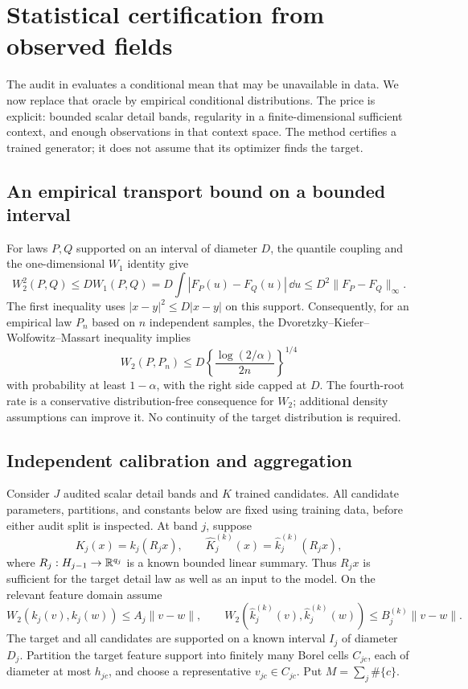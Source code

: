 \section{Statistical certification from observed fields}\label{sec:observed-audit}
The audit in  evaluates a conditional mean that may be unavailable in data. We now replace that oracle by empirical conditional distributions. The price is explicit: bounded scalar detail bands, regularity in a finite-dimensional sufficient context, and enough observations in that context space. The method certifies a trained generator; it does not assume that its optimizer finds the target.

\subsection{An empirical transport bound on a bounded interval}
For laws $P,Q$ supported on an interval of diameter $D$, the quantile coupling and the one-dimensional $W_1$ identity give
\begin{equation}\label{eq:cdf-transport}
 W_2^2(P,Q)\le D W_1(P,Q)
 =D\int|F_P(u)-F_Q(u)|\,\dd u
 \le D^2\|F_P-F_Q\|_\infty.
\end{equation}
The first inequality uses $|x-y|^2\le D|x-y|$ on this support. Consequently, for an empirical law $P_n$ based on $n$ independent samples, the Dvoretzky--Kiefer--Wolfowitz--Massart inequality \citep{massart1990} implies
\begin{equation}\label{eq:empirical-w2}
 W_2(P,P_n)\le D\left\{\frac{\log(2/\alpha)}{2n}\right\}^{1/4}
\end{equation}
with probability at least $1-\alpha$, with the right side capped at $D$. The fourth-root rate is a conservative distribution-free consequence for $W_2$; additional density assumptions can improve it. No continuity of the target distribution is required.

\subsection{Independent calibration and aggregation}
Consider $J$ audited scalar detail bands and $K$ trained candidates. All candidate parameters, partitions, and constants below are fixed using training data, before either audit split is inspected. At band $j$, suppose
\[
 K_j(x)=k_j(R_jx),\qquad
 \widehat K_j^{(k)}(x)=\widehat k_j^{(k)}(R_jx),
\]
where $R_j:H_{j-1}\to\mathbb R^{q_j}$ is a known bounded linear summary. Thus $R_jx$ is sufficient for the target detail law as well as an input to the model. On the relevant feature domain assume
\begin{equation}\label{eq:feature-regularity}
 W_2(k_j(v),k_j(w))\le A_j\|v-w\|,\qquad
 W_2(\widehat k_j^{(k)}(v),\widehat k_j^{(k)}(w))\le B_j^{(k)}\|v-w\|.
\end{equation}
The target and all candidates are supported on a known interval $I_j$ of diameter $D_j$. Partition the target feature support into finitely many Borel cells $C_{jc}$, each of diameter at most $h_{jc}$, and choose a representative $v_{jc}\in C_{jc}$. Put $M=\sum_j\#\{c\}$.

